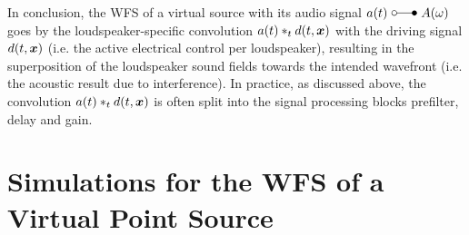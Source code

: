 In conclusion, the WFS of a virtual source with its audio signal
$a(t) \,\,\laplace\,\, A(\omega)$ goes by the loudspeaker-specific
convolution $a(t) \ast_t d(t,\bm{x})$ with the driving signal $d(t,\bm{x})$
(i.e. the active electrical control per loudspeaker), resulting in the
superposition of the loudspeaker sound fields towards the intended
wavefront (i.e. the acoustic result due to interference).
%
In practice, as discussed above, the convolution $a(t) \ast_t d(t,\bm{x})$
is often split into the signal processing blocks
prefilter, delay and gain.



\section{Simulations for the WFS of a Virtual Point Source}
\label{sec:WFS_PointSource_Simulationen}

